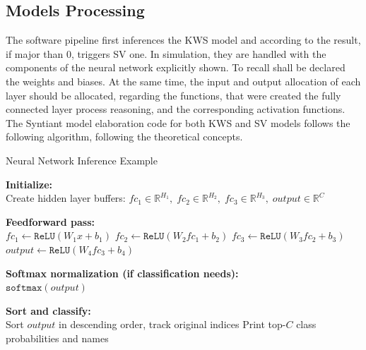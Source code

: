 \subsection{Models Processing}
The software pipeline first inferences the KWS model and according to the result, if major than 0, triggers SV one. In simulation, they are handled with the components of the neural network explicitly shown. To recall shall be declared the weights and biases. At the same time, the input and output allocation of each layer should be allocated, regarding the functions, that were created the fully connected layer process reasoning, and the corresponding activation functions. The Syntiant model elaboration code for both KWS and SV models follows the following algorithm\footnotemark{}, following the theoretical concepts.\newline
\begin{algorithm}[H]
\caption{Neural Network Inference Example}

\textbf{Initialize:} \\
\Indp
Create hidden layer buffers:
$fc_1 \in \mathbb{R}^{H_1}, \;
fc_2 \in \mathbb{R}^{H_2}, \;
fc_3 \in \mathbb{R}^{H_3}, \;
output \in \mathbb{R}^{C}$ \;
\Indm

\textbf{Feedforward pass:} \\
\Indp
$fc_1 \gets \texttt{ReLU}(W_1 x + b_1)$ \;
$fc_2 \gets \texttt{ReLU}(W_2 fc_1 + b_2)$ \;
$fc_3 \gets \texttt{ReLU}(W_3 fc_2 + b_3)$ \;
$output \gets \texttt{ReLU}(W_4 fc_3 + b_4)$ \;
\Indm

\textbf{Softmax normalization (if classification needs):} \\
\Indp
$\texttt{softmax}(output)$ \;
\Indm

\textbf{Sort and classify:} \\
\Indp
Sort $output$ in descending order, track original indices \;
Print top-$C$ class probabilities and names \;
\Indm

\end{algorithm}

